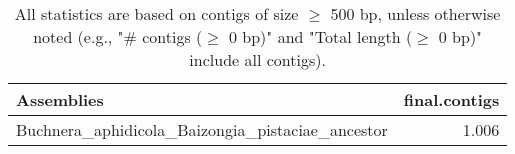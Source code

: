 \documentclass[12pt,a4paper]{article}
\begin{document}
\begin{table}[ht]
\begin{center}
\caption{All statistics are based on contigs of size $\geq$ 500 bp, unless otherwise noted (e.g., "\# contigs ($\geq$ 0 bp)" and "Total length ($\geq$ 0 bp)" include all contigs).}
\begin{tabular}{|l*{1}{|r}|}
\hline
Assemblies & final.contigs \\ \hline
Buchnera\_aphidicola\_Baizongia\_pistaciae\_ancestor & 1.006 \\ \hline
\end{tabular}
\end{center}
\end{table}
\end{document}
